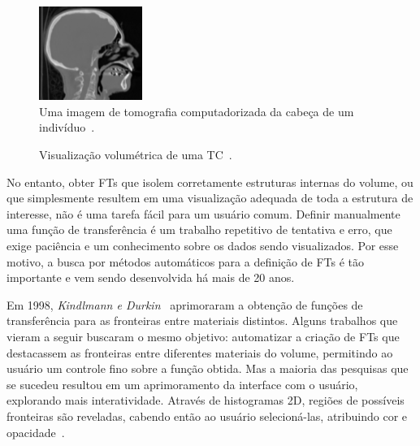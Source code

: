 \begin{figure}[h]
	\centering
	\includegraphics[width=0.3\textwidth]{images/head_ct_slice_intro}
    \caption{Uma imagem de tomografia computadorizada da cabeça de um indivíduo~\cite{gordonms}.}
    \label{fig:head_ct_slice_intro}
\end{figure}
\begin{figure}[h]
	\centering
    \caption{Visualização volumétrica de uma TC~\cite{gordonms}.}
    \label{fig:head_skull_intro}
\end{figure}
    
    No entanto, obter FTs que isolem corretamente estruturas internas do volume, ou que simplesmente resultem em uma visualização adequada de toda a estrutura de interesse, não é uma tarefa fácil para um usuário comum. Definir manualmente uma função de transferência é um trabalho repetitivo de tentativa e erro, que exige paciência e um conhecimento sobre os dados sendo visualizados. Por esse motivo, a busca por métodos automáticos para a definição de FTs é tão importante e vem sendo desenvolvida há mais de 20 anos.
    
    Em 1998, \textit{Kindlmann e Durkin}~\cite{gordon} aprimoraram a obtenção de funções de transferência para as fronteiras entre materiais distintos. Alguns trabalhos que vieram a seguir buscaram o mesmo objetivo: automatizar a criação de FTs que destacassem as fronteiras entre diferentes materiais do volume, permitindo ao usuário um controle fino sobre a função obtida. Mas a maioria das pesquisas que se sucedeu resultou em um aprimoramento da interface com o usuário, explorando mais interatividade. Através de histogramas 2D, regiões de possíveis fronteiras são reveladas, cabendo então ao usuário selecioná-las, atribuindo cor e opacidade~\cite{haidacher, sereda1, wang, zou}.
    
